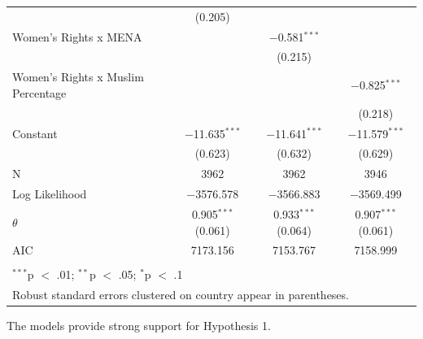 \documentclass[11pt, oneside]{article}
\begin{document}
\begin{table}[!htbp]
\begin{tabular}{@{\extracolsep{5pt}}lccc}
  & (0.205) &  &  \\ 
  Women's Rights x MENA &  & $-$0.581$^{***}$ &  \\ 
  &  & (0.215) &  \\ 
  Women's Rights x Muslim Percentage &  &  & $-$0.825$^{***}$ \\ 
  &  &  & (0.218) \\ 
  Constant & $-$11.635$^{***}$ & $-$11.641$^{***}$ & $-$11.579$^{***}$ \\ 
  & (0.623) & (0.632) & (0.629) \\ 
 N & 3962 & 3962 & 3946 \\ 
Log Likelihood & $-$3576.578 & $-$3566.883 & $-$3569.499 \\ 
$\theta$ & 0.905$^{***}$  (0.061) & 0.933$^{***}$  (0.064) & 0.907$^{***}$  (0.061) \\ 
AIC & 7173.156 & 7153.767 & 7158.999 \\ 
\hline \\[-1.8ex] 
\multicolumn{4}{l}{$^{***}$p $<$ .01; $^{**}$p $<$ .05; $^{*}$p $<$ .1} \\ 
\multicolumn{4}{l}{Robust standard errors clustered on country appear in parentheses.} \\ 
\end{tabular} 
\end{table} 

The models provide strong support for Hypothesis 1. 
\end{document}
